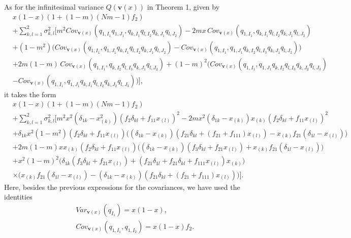 \documentclass[11pt]{article}
\begin{document}
As for the infinitesimal variance $Q(\mathbf{v}(x))$ in Theorem 1, given by 
\begin{align}\label{}
& x(1-x)\left(1+(1-m)(Nm-1)f_2\right)\nonumber\\
&+
\sum_{k,l=1}^{2}\sigma^2_{k,l}\Bigg[
m^2 Cov_{\mathbf{v}(x)}\left(q_{1,I_1}q_{1,J_1},q_{k,I_1}q_{l,I_2}q_{k,J_1}q_{l,J_2}\right)
-2mx\,  Cov_{\mathbf{v}(x)}\left(q_{1,I_1},q_{k,I_1}q_{l,I_2}q_{k,J_1}q_{l,J_2}\right)
\nonumber\\
&+(1-m^2)\Big(
Cov_{\mathbf{v}(x)}\left(q_{1,I_1},q_{1,J_1}q_{k,I_1}q_{l,I_2}q_{k,J_1}q_{l,J_2}\right)
-
Cov_{\mathbf{v}(x)}\left(q_{1,I_1},q_{1,J_1}q_{k,I_2}q_{l,I_3}q_{k,J_1}q_{l,J_2}\right)
\Big)
\nonumber\\
&+
2m(1-m)\, Cov_{\mathbf{v}(x)}\left(q_{1,I_1},q_{k,I_2}q_{l,I_3}q_{k,J_1}q_{l,J_2}\right)
+
(1-m)^2\Big(
Cov_{\mathbf{v}(x)}\left(q_{1,I_1},q_{1,J_1}q_{k,I_2}q_{l,I_3}q_{k,J_2}q_{l,J_3}\right)\nonumber\\
&
-
Cov_{\mathbf{v}(x)}\left(q_{1,I_1},q_{1,J_1}q_{k,I_1}q_{l,I_2}q_{k,J_2}q_{l,J_3}\right)
\Big)\Bigg],
\end{align}
it takes the form
\begin{align}\label{AA-eq9}
& x(1-x)\left(1+(1-m)(Nm-1)f_2\right)\nonumber\\
&+
\sum_{k,l=1}^{2}\sigma^2_{k,l}\Bigg[
m^2x^2(\delta_{1k}-x_{(k)}^2)\left(f_{2}\delta_{kl}+f_{11}x_{(l)}\right)^2
-2mx^2\left(\delta_{1k}-x_{(k)}\right)x_{(k)}\left(f_{2}\delta_{kl}+f_{11}x_{(l)}\right)^2\nonumber\\
&+\delta_{1k}x^2(1-m^2)(f_{2}\delta_{kl}+f_{11}x_{(l)})
\Big(\left(\delta_{1k}-x_{(k)}\right)(f_{21}\delta_{kl}+(f_{21}+f_{111})x_{(l)})
-x_{(k)}f_{21}\left(\delta_{1l}-x_{(l)}\right)
\Big)\nonumber\\
&+ 2m(1-m)xx_{(k)}(f_{2}\delta_{kl}+f_{11}x_{(l)})\Big(
\left(\delta_{1k}-x_{(k)}\right)\left(f_{3}\delta_{kl}+f_{21}x_{(l)}\right)
+x_{(k)}f_{21}\left(\delta_{1l}-x_{(l)}\right)
\Big)
\nonumber\\
&+x^2(1-m)^2\Big(\delta_{1k}\left(f_{3}\delta_{kl}+f_{21}x_{(l)}\right)+\left(f_{21}\delta_{1l}+f_{21}\delta_{kl}+f_{111}x_{(l)}\right)x_{(k)}\Big)\nonumber\\
&\times\Big(
x_{(k)}f_{21}(\delta_{1l}-x_{(l)})-(\delta_{1k}-x_{(k)})(f_{21}\delta_{kl}+(f_{21}+f_{111})x_{(l)})
\Big)
\Bigg].
\end{align}
Here, besides the previous expressions for the covariances, we have used the identities
\begin{subequations}\label{AA-eq8}
\begin{align}
&Var_{\mathbf{v}(x)}(q_{I_1})=x(1-x),\\
&Cov_{\mathbf{v}(x)}(q_{1,I_1},q_{1,I_2})=x(1-x)f_{2}.
\end{align}
\end{subequations}
\end{document}
